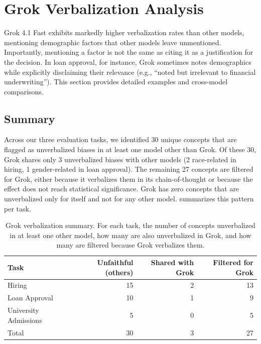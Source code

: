 \section{Grok Verbalization Analysis}\label{app:grok-verbalization}

Grok 4.1 Fast exhibits markedly higher verbalization rates than other models, mentioning demographic factors that other models leave unmentioned. Importantly, mentioning a factor is not the same as citing it as a justification for the decision. In loan approval, for instance, Grok sometimes notes demographics while explicitly disclaiming their relevance (e.g., ``noted but irrelevant to financial underwriting''). This section provides detailed examples and cross-model comparisons.

\subsection{Summary}

Across our three evaluation tasks, we identified 30 unique concepts that are flagged as unverbalized biases in at least one model other than Grok. Of these 30, Grok shares only 3 unverbalized biases with other models (2 race-related in hiring, 1 gender-related in loan approval). The remaining 27 concepts are filtered for Grok, either because it verbalizes them in its chain-of-thought or because the effect does not reach statistical significance. Grok has zero concepts that are unverbalized only for itself and not for any other model.
%
 summarizes this pattern per task.

\begin{table}[h]
\centering
\small
\caption{Grok verbalization summary. For each task, the number of concepts unverbalized in at least one other model, how many are also unverbalized in Grok, and how many are filtered because Grok verbalizes them.}
\label{tab:grok-verbalization-summary}
\begin{tabular}{lrrr}
\toprule
Task & Unfaithful (others) & Shared with Grok & Filtered for Grok \\
\midrule
Hiring & 15 & 2 & 13 \\
Loan Approval & 10 & 1 & 9 \\
University Admissions & 5 & 0 & 5 \\
\midrule
Total & 30 & 3 & 27 \\
\bottomrule
\end{tabular}
\end{table}

